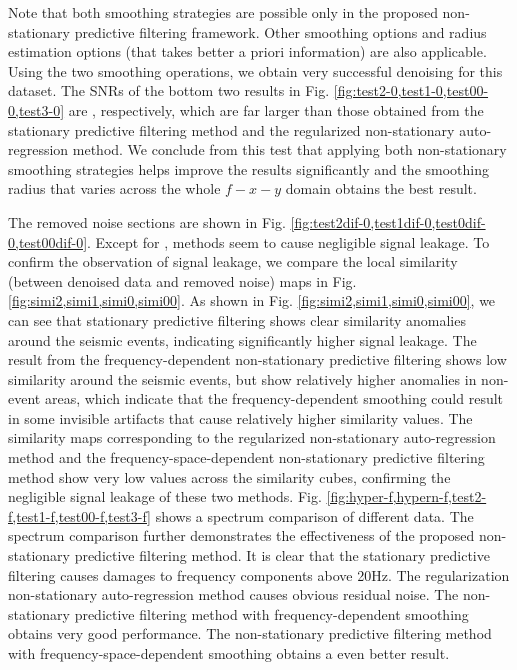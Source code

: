 Note that both smoothing strategies are possible only in the proposed non-stationary predictive filtering framework. Other smoothing options and radius estimation options (that takes better a priori information) are also applicable. Using the two smoothing operations, we obtain very successful denoising for this dataset.  The SNRs of the bottom two results in Fig. \ref{fig:test2-0,test1-0,test00-0,test3-0} are , respectively, which are far larger than those obtained from the stationary predictive filtering method and the regularized non-stationary auto-regression method. We conclude from this test that applying both non-stationary smoothing strategies helps improve the results significantly and the smoothing radius that varies across the whole $f-x-y$ domain obtains the best result. 

The removed noise sections are shown in Fig. \ref{fig:test2dif-0,test1dif-0,test0dif-0,test00dif-0}. Except for   ,  methods seem to cause negligible signal leakage. To confirm the observation of signal leakage, we compare the local similarity (between denoised data and removed noise) maps in Fig. \ref{fig:simi2,simi1,simi0,simi00}. As shown in Fig. \ref{fig:simi2,simi1,simi0,simi00}, we can see that stationary predictive filtering shows clear similarity anomalies around the seismic events, indicating significantly higher signal leakage. The result from the frequency-dependent non-stationary predictive filtering shows low similarity around the seismic events, but show relatively higher anomalies in non-event areas, which indicate that the frequency-dependent smoothing could result in some invisible artifacts that cause relatively higher similarity values. The similarity maps corresponding to the regularized non-stationary auto-regression method and the frequency-space-dependent non-stationary predictive filtering method show very low values across the similarity cubes, confirming the negligible signal leakage of these two methods. Fig. \ref{fig:hyper-f,hypern-f,test2-f,test1-f,test00-f,test3-f} shows a spectrum comparison of different data. The spectrum comparison further demonstrates the effectiveness of the proposed non-stationary predictive filtering method. It is clear that the stationary predictive filtering causes damages to frequency components above 20Hz. The regularization non-stationary auto-regression method causes obvious residual noise. The non-stationary predictive filtering method with frequency-dependent smoothing obtains very good performance. The non-stationary predictive filtering method with frequency-space-dependent smoothing obtains a even better result. 

